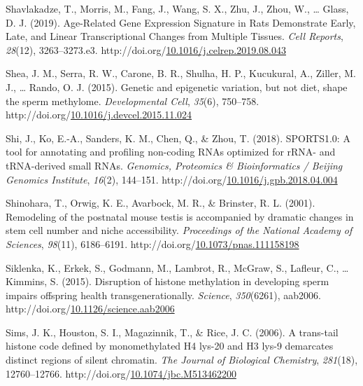\documentclass[12pt,twoside]{reedthesis}
\newlength{\cslhangindent}
\newenvironment{CSLReferences}[2] %
 {%
  \setlength{\parindent}{0pt}
  \ifodd #1 \everypar{\setlength{\hangindent}{\cslhangindent}}\ignorespaces\fi
  \ifnum #2 > 0
  \setlength{\parskip}{#2\baselineskip}
  \fi
 }%
 {}
\begin{document}
\begin{CSLReferences}{1}{0}
\leavevmode{}%
Shavlakadze, T., Morris, M., Fang, J., Wang, S. X., Zhu, J., Zhou, W., \ldots{} Glass, D. J. (2019). Age-Related Gene Expression Signature in Rats Demonstrate Early, Late, and Linear Transcriptional Changes from Multiple Tissues. \emph{Cell Reports}, \emph{28}(12), 3263--3273.e3. http://doi.org/\href{https://doi.org/10.1016/j.celrep.2019.08.043}{10.1016/j.celrep.2019.08.043}

\leavevmode{}%
Shea, J. M., Serra, R. W., Carone, B. R., Shulha, H. P., Kucukural, A., Ziller, M. J., \ldots{} Rando, O. J. (2015). Genetic and epigenetic variation, but not diet, shape the sperm methylome. \emph{Developmental Cell}, \emph{35}(6), 750--758. http://doi.org/\href{https://doi.org/10.1016/j.devcel.2015.11.024}{10.1016/j.devcel.2015.11.024}

\leavevmode{}%
Shi, J., Ko, E.-A., Sanders, K. M., Chen, Q., \& Zhou, T. (2018). SPORTS1.0: A tool for annotating and profiling non-coding RNAs optimized for rRNA- and tRNA-derived small RNAs. \emph{Genomics, Proteomics \& Bioinformatics / Beijing Genomics Institute}, \emph{16}(2), 144--151. http://doi.org/\href{https://doi.org/10.1016/j.gpb.2018.04.004}{10.1016/j.gpb.2018.04.004}

\leavevmode{}%
Shinohara, T., Orwig, K. E., Avarbock, M. R., \& Brinster, R. L. (2001). Remodeling of the postnatal mouse testis is accompanied by dramatic changes in stem cell number and niche accessibility. \emph{Proceedings of the National Academy of Sciences}, \emph{98}(11), 6186--6191. http://doi.org/\href{https://doi.org/10.1073/pnas.111158198}{10.1073/pnas.111158198}

\leavevmode{}%
Siklenka, K., Erkek, S., Godmann, M., Lambrot, R., McGraw, S., Lafleur, C., \ldots{} Kimmins, S. (2015). Disruption of histone methylation in developing sperm impairs offspring health transgenerationally. \emph{Science}, \emph{350}(6261), aab2006. http://doi.org/\href{https://doi.org/10.1126/science.aab2006}{10.1126/science.aab2006}

\leavevmode{}%
Sims, J. K., Houston, S. I., Magazinnik, T., \& Rice, J. C. (2006). A trans-tail histone code defined by monomethylated H4 lys-20 and H3 lys-9 demarcates distinct regions of silent chromatin. \emph{The Journal of Biological Chemistry}, \emph{281}(18), 12760--12766. http://doi.org/\href{https://doi.org/10.1074/jbc.M513462200}{10.1074/jbc.M513462200}


\end{CSLReferences}
\end{document}
